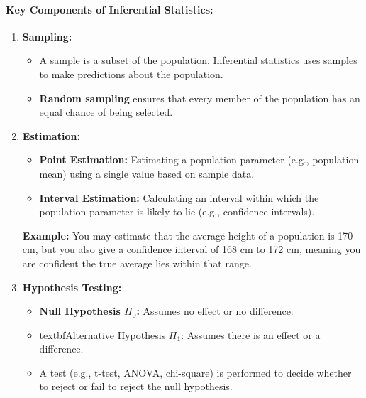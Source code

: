 \documentclass[12pt]{book}
\providecommand{\tightlist}{%
  \setlength{\itemsep}{0pt}\setlength{\parskip}{0pt}}
\begin{document}
\paragraph{\texorpdfstring{\textbf{Key Components of Inferential
Statistics:}}{Key Components of Inferential Statistics:}}\label{key-components-of-inferential-statistics}

\begin{enumerate}
\def\labelenumi{\arabic{enumi}.}
\item
  \textbf{Sampling:}

  \begin{itemize}
  \tightlist
  \item
    A sample is a subset of the population. Inferential statistics uses
    samples to make predictions about the population.
  \item
    \textbf{Random sampling} ensures that every member of the population
    has an equal chance of being selected.
  \end{itemize}
\item
  \textbf{Estimation:}

  \begin{itemize}
  \tightlist
  \item
    \textbf{Point Estimation:} Estimating a population parameter (e.g.,
    population mean) using a single value based on sample data.
  \item
    \textbf{Interval Estimation:} Calculating an interval within which
    the population parameter is likely to lie (e.g., confidence
    intervals).
  \end{itemize}

  \textbf{Example:} You may estimate that the average height of a
  population is 170 cm, but you also give a confidence interval of 168
  cm to 172 cm, meaning you are confident the true average lies within
  that range.
\item
  \textbf{Hypothesis Testing:}

  \begin{itemize}
  \tightlist
  \item \textbf{Null Hypothesis \(H_{0}\):} Assumes no effect or no difference.
  \item textbf{Alternative Hypothesis \(H_{1}\):} Assumes there is an effect or
    a difference.
  \item
    A test (e.g., t-test, ANOVA, chi-square) is performed to decide
    whether to reject or fail to reject the null hypothesis.
  \end{itemize}


\end{enumerate}
\end{document}
